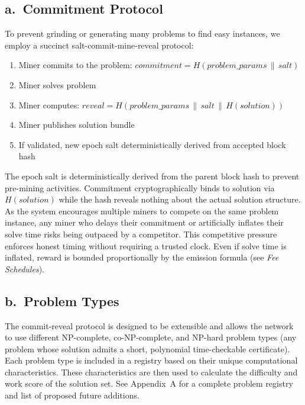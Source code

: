 \documentclass[12pt,letterpaper]{article}
\begin{document}
\subsection*{a.\ Commitment Protocol}

To prevent grinding or generating many problems to find easy instances, we employ a succinct
salt-commit-mine-reveal protocol:

\begin{enumerate}[leftmargin=2em,itemsep=2pt]
  \item Miner commits to the problem: $\mathit{commitment} = H(\mathit{problem\_params} \,\|\, \mathit{salt})$
  \item Miner solves problem
  \item Miner computes: $\mathit{reveal} = H(\mathit{problem\_params} \,\|\, \mathit{salt} \,\|\, H(\mathit{solution}))$
  \item Miner publishes solution bundle
  \item If validated, new epoch salt deterministically derived from accepted block hash
\end{enumerate}

The epoch salt is deterministically derived from the parent block hash to prevent pre-mining activities.
Commitment cryptographically binds to solution via $H(\mathit{solution})$ while the hash reveals nothing
about the actual solution structure. As the system encourages multiple miners to compete on the same
problem instance, any miner who delays their commitment or artificially inflates their solve time risks
being outpaced by a competitor. This competitive pressure enforces honest timing without requiring a
trusted clock. Even if solve time is inflated, reward is bounded proportionally by the emission formula
(see \emph{Fee Schedules}).

\subsection*{b.\ Problem Types}

The commit-reveal protocol is designed to be extensible and allows the network to use different
NP-complete, co-NP-complete, and NP-hard problem types (any problem whose solution admits a short,
polynomial time-checkable certificate). Each problem type is included in a registry based on their
unique computational characteristics. These characteristics are then used to calculate the
difficulty and work score of the solution set. See Appendix~A for a complete problem registry and list of
proposed future additions.
\end{document}
